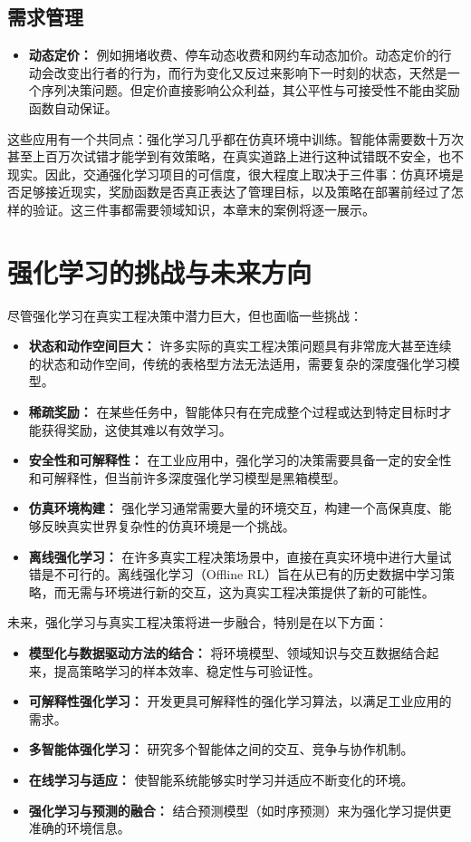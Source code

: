 \subsection{需求管理}
\begin{itemize}
    \item \textbf{动态定价：} 例如拥堵收费、停车动态收费和网约车动态加价。动态定价的行动会改变出行者的行为，而行为变化又反过来影响下一时刻的状态，天然是一个序列决策问题。但定价直接影响公众利益，其公平性与可接受性不能由奖励函数自动保证。
\end{itemize}

这些应用有一个共同点：强化学习几乎都在仿真环境中训练。智能体需要数十万次甚至上百万次试错才能学到有效策略，在真实道路上进行这种试错既不安全，也不现实。因此，交通强化学习项目的可信度，很大程度上取决于三件事：仿真环境是否足够接近现实，奖励函数是否真正表达了管理目标，以及策略在部署前经过了怎样的验证。这三件事都需要领域知识，本章末的案例将逐一展示。

\section{强化学习的挑战与未来方向}
尽管强化学习在真实工程决策中潜力巨大，但也面临一些挑战：
\begin{itemize}
    \item \textbf{状态和动作空间巨大：} 许多实际的真实工程决策问题具有非常庞大甚至连续的状态和动作空间，传统的表格型方法无法适用，需要复杂的深度强化学习模型。
    \item \textbf{稀疏奖励：} 在某些任务中，智能体只有在完成整个过程或达到特定目标时才能获得奖励，这使其难以有效学习。
    \item \textbf{安全性和可解释性：} 在工业应用中，强化学习的决策需要具备一定的安全性和可解释性，但当前许多深度强化学习模型是黑箱模型。
    \item \textbf{仿真环境构建：} 强化学习通常需要大量的环境交互，构建一个高保真度、能够反映真实世界复杂性的仿真环境是一个挑战。
    \item \textbf{离线强化学习：} 在许多真实工程决策场景中，直接在真实环境中进行大量试错是不可行的。离线强化学习（Offline RL）旨在从已有的历史数据中学习策略，而无需与环境进行新的交互，这为真实工程决策提供了新的可能性。
\end{itemize}

未来，强化学习与真实工程决策将进一步融合，特别是在以下方面：
\begin{itemize}
    \item \textbf{模型化与数据驱动方法的结合：} 将环境模型、领域知识与交互数据结合起来，提高策略学习的样本效率、稳定性与可验证性。
    \item \textbf{可解释性强化学习：} 开发更具可解释性的强化学习算法，以满足工业应用的需求。
    \item \textbf{多智能体强化学习：} 研究多个智能体之间的交互、竞争与协作机制。
    \item \textbf{在线学习与适应：} 使智能系统能够实时学习并适应不断变化的环境。
\item \textbf{强化学习与预测的融合：} 结合预测模型（如时序预测）来为强化学习提供更准确的环境信息。
\end{itemize}

